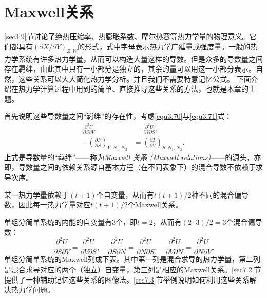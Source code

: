 
\chapter{Maxwell关系}
\label{chap7}

\ref{sec3.9}节讨论了绝热压缩率、热膨胀系数、摩尔热容等热力学量的物理意义。它们都具有$(\partial X / \partial Y)_{Z, W}$的形式，式中字母表示热力学广延量或强度量。一般的热力学系统有许多热力学量，从而可以构造大量这样的导数。但是众多的导数量之间存在羁绊，由此其中只有一小部分是独立的，其余的量可以用这一小部分表示。自然，这些关系可以大大简化热力学分析。并且我们不需要特意记忆公式。 下面介绍在热力学计算过程中用到的简单、直接推导这些关系的方法，也就是本章的主题。

首先说明这些导数量之间“羁绊”的存在性，考虑\eqref{equ3.70}与\eqref{equ3.71}式：
\begin{align}
	\frac{\partial^2 U}{\partial S \partial V} &= \frac{\partial^2 U}{\partial V \partial S}, \label{equ7.1} \\
	-\left( \frac{\partial P}{\partial S} \right)_{V, N_1, N_2} &= \left( \frac{\partial T}{\partial V} \right)_{S, N_1, N_2}. \label{equ7.2}
\end{align}
上式是导数量的“羁绊”——称为{\it Maxwell 关系 (Maxwell relations)}——的源头，亦即，导数量之间的依赖关系源自基本方程（在不同表象下）的混合导数不依赖于求导次序。

某一热力学量依赖于$(t + 1)$个自变量，从而有$t(t + 1)/2$种不同的混合偏导数，因此每一热力学量对应$t(t + 1)/2$个Maxwell关系。

单组分简单系统的内能的自变量有$3$个，即$t = 2$，从而有$(2 \cdot 3)/2 = 3$个混合偏导数：
\[
	\frac{\partial^2 U}{\partial S \partial V} = \frac{\partial^2 U}{\partial V \partial S}, \quad \frac{\partial^2 U}{\partial S \partial N} = \frac{\partial^2 U}{\partial N \partial S}, \quad \frac{\partial^2 U}{\partial V \partial N} = \frac{\partial^2 U}{\partial N \partial V}.
\]
单组分简单系统的Maxwell列成下表。其中第一列是混合求导的热力学量，第二列是混合求导对应的两个（独立）自变量，第三列是相应的Maxwell关系。\ref{sec7.2}节提供了一种辅助记忆这些关系的图像法。\ref{sec7.3}节举例说明如何利用这些关系解决热力学问题。

